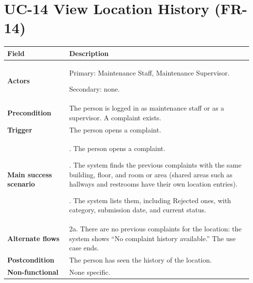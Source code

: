 \documentclass[11pt,a4paper]{report}
\begin{document}
\section{UC-14 View Location History (FR-14)}
\begin{longtable}{|>{\raggedright\arraybackslash}p{3.0cm}|>{\raggedright\arraybackslash}p{12.4cm}|}
\hline \textbf{Field} & \textbf{Description} \\ \hline \endhead
\textbf{Actors} & Primary: Maintenance Staff, Maintenance Supervisor.\par\smallskip Secondary: none. \\ \hline
\textbf{Precondition} & The person is logged in as maintenance staff or as a supervisor. A complaint exists. \\ \hline
\textbf{Trigger} & The person opens a complaint. \\ \hline
\textbf{Main success scenario} & 1. The person opens a complaint.\par\smallskip 2. The system finds the previous complaints with the same building, floor, and room or area (shared areas such as hallways and restrooms have their own location entries).\par\smallskip 3. The system lists them, including Rejected ones, with category, submission date, and current status. \\ \hline
\textbf{Alternate flows} & 2a. There are no previous complaints for the location: the system shows ``No complaint history available.'' The use case ends. \\ \hline
\textbf{Postcondition} & The person has seen the history of the location. \\ \hline
\textbf{Non-functional} & None specific. \\ \hline
\end{longtable}
\end{document}
